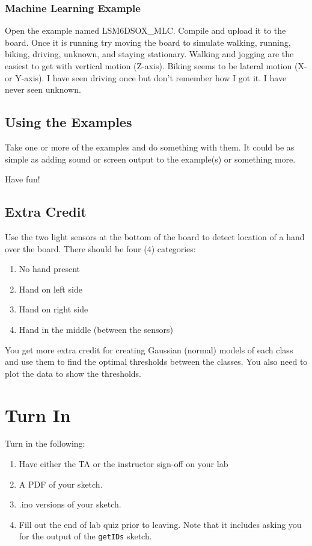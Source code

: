 \subsubsection{Machine Learning Example}
Open the example named LSM6DSOX\_MLC. Compile and upload it to the board. Once it is 
running try moving the board to simulate walking, running, biking, driving, unknown, and 
staying stationary. Walking and jogging are the easiest to get with vertical motion (Z-axis). 
Biking seems to be lateral motion (X- or Y-axis). I have seen driving once but don't remember 
how I got it. I have never seen unknown.

\subsection{Using the Examples}
Take one or more of the examples and do something with them. It could be as simple as 
adding sound or screen output to the example(s) or something more.

\medskip

\noindent Have fun!

\subsection{Extra Credit}
Use the two light sensors at the bottom of the board to detect location of a hand over the
board. There should be four (4) categories:
\begin{enumerate}
    \item No hand present
    \item Hand on left side
    \item Hand on right side
    \item Hand in the middle (between the sensors)
\end{enumerate}

You get more extra credit for creating Gaussian (normal) models of each class and 
use them to find the optimal thresholds between the classes. You also need to plot 
the data to show the thresholds.

\section{Turn In}
Turn in the following:
\begin{enumerate}
    \item Have either the TA or the instructor sign-off on your lab
    \item A PDF of your sketch.
    \item .ino versions of your sketch.
    \item Fill out the end of lab quiz prior to leaving. Note that it includes asking you 
            for the output of the \lstinline$getIDs$ sketch. 
\end{enumerate}

